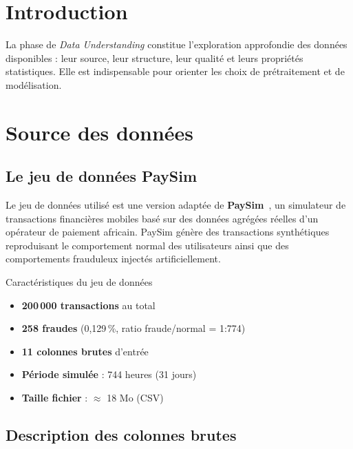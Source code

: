 \documentclass[12pt,a4paper,twoside]{report}
\theoremstyle{definition}
\begin{document}
\section{Introduction}

La phase de \textit{Data Understanding} constitue l'exploration approfondie des
données disponibles : leur source, leur structure, leur qualité et leurs propriétés
statistiques. Elle est indispensable pour orienter les choix de prétraitement et
de modélisation.

\section{Source des données}

\subsection{Le jeu de données PaySim}

Le jeu de données utilisé est une version adaptée de \textbf{PaySim}~\cite{lopez-rojas2016paysim},
un simulateur de transactions financières mobiles basé sur des données agrégées
réelles d'un opérateur de paiement africain. PaySim génère des transactions synthétiques
reproduisant le comportement normal des utilisateurs ainsi que des comportements
frauduleux injectés artificiellement.

\begin{pwcbox}{Caractéristiques du jeu de données}
\begin{itemize}
  \item \textbf{200\,000 transactions} au total
  \item \textbf{258 fraudes} (0,129\,\%, ratio fraude/normal = 1:774)
  \item \textbf{11 colonnes brutes} d'entrée
  \item \textbf{Période simulée} : 744 heures (31 jours)
  \item \textbf{Taille fichier} : $\approx$ 18 Mo (CSV)
\end{itemize}
\end{pwcbox}

\subsection{Description des colonnes brutes}
\end{document}
